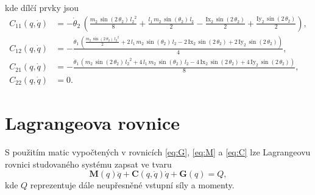 \documentclass[twoside]{article}
\begin{document}
kde dílčí prvky jsou
\begin{equation}
	\begin{split}
		C_{11}(q, \dot{q}) &= -\dot{\theta}_{2}\,\left(\frac{m_{2}\,\sin\left(2\,\theta _{2}\right)\,{l_{2}}^2}{8}+\frac{l_{1}\,m_{2}\,\sin\left(\theta _{2}\right)\,l_{2}}{2}-\frac{\mathrm{Ix}_{2}\,\sin\left(2\,\theta _{2}\right)}{2}+\frac{\mathrm{Iy}_{2}\,\sin\left(2\,\theta _{2}\right)}{2}\right) ,\\
		C_{12}(q, \dot{q}) &= -\frac{\dot{\theta}_{1}\,\left(\frac{m_{2}\,\sin\left(2\,\theta _{2}\right)\,{l_{2}}^2}{2}+2\,l_{1}\,m_{2}\,\sin\left(\theta _{2}\right)\,l_{2}-2\,\mathrm{Ix}_{2}\,\sin\left(2\,\theta _{2}\right)+2\,\mathrm{Iy}_{2}\,\sin\left(2\,\theta _{2}\right)\right)}{4} ,\\
		C_{21}(q, \dot{q}) &= -\frac{\dot{\theta}_{1}\,\left(m_{2}\,\sin\left(2\,\theta _{2}\right)\,{l_{2}}^2+4\,l_{1}\,m_{2}\,\sin\left(\theta _{2}\right)\,l_{2}-4\,\mathrm{Ix}_{2}\,\sin\left(2\,\theta _{2}\right)+4\,\mathrm{Iy}_{2}\,\sin\left(2\,\theta _{2}\right)\right)}{8} ,\\
		C_{22}(q, \dot{q}) &= 0.
	\end{split}
\end{equation}

\section{Lagrangeova rovnice}

S použitím matic vypočtených v rovnicích \eqref{eq:G}, \eqref{eq:M} a \eqref{eq:C} lze Lagrangeovu rovnici studovaného systému zapsat ve tvaru
\begin{equation}
	\mathbf{M}(q) \ddot{q} + \mathbf{C}(q, \dot{q}) \dot{q} + \mathbf{G}(q) = Q,
\end{equation}
kde $Q$ reprezentuje dále neupřesněné vstupní síly a momenty.
\end{document}
